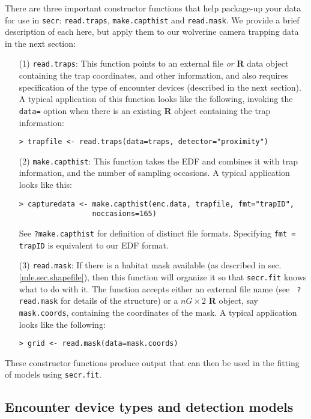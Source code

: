 There are three important constructor functions that help package-up
your 
data for use in \mbox{\tt secr}:
\mbox{\tt read.traps},
\mbox{\tt make.capthist} and
\mbox{\tt read.mask}. 
We provide a brief description of each here, but apply them to our
wolverine camera trapping data in the next section:
\begin{itemize}
\item[(1)] 
\mbox{\tt read.traps}: This function points to an external file {\it or}
{\bf R} data object containing the trap coordinates, and other
information, and also requires specification of the type of encounter
devices (described in the next section). A typical application of this
function looks like the following, invoking the \mbox{\tt data=} option 
when there is an existing {\bf R} object
containing the trap information:
\begin{verbatim}
> trapfile <- read.traps(data=traps, detector="proximity")
\end{verbatim}
\item[(2)] \mbox{\tt make.capthist}: This function takes the EDF and combines it
with trap information, and the number of sampling occasions. A typical
application looks like this:
\begin{verbatim}
> capturedata <- make.capthist(enc.data, trapfile, fmt="trapID",
                 noccasions=165)
\end{verbatim}
See \mbox{\tt ?make.capthist} for definition of distinct file
formats. Specifying  \mbox{\tt fmt = trapID}  is equivalent to our EDF format.
\item[(3)] \mbox{\tt read.mask}: If there is a habitat mask
  available 
(as described in sec. \ref{mle.sec.shapefile}), then this function
will organize it so that \mbox{\tt secr.fit} knows what to do with it.
The function accepts either an external file name (see \mbox{\tt
  ?read.mask} for details of the structure) or a $nG \times 2$ {\bf R}
object, say \mbox{\tt mask.coords},
containing the coordinates of the mask. A typical application looks
like the following:
\begin{verbatim}
> grid <- read.mask(data=mask.coords)
\end{verbatim}
\end{itemize}
These constructor functions produce output that can then be used in
the fitting of models using \mbox{\tt secr.fit}.

\subsection{Encounter device types and detection models}

